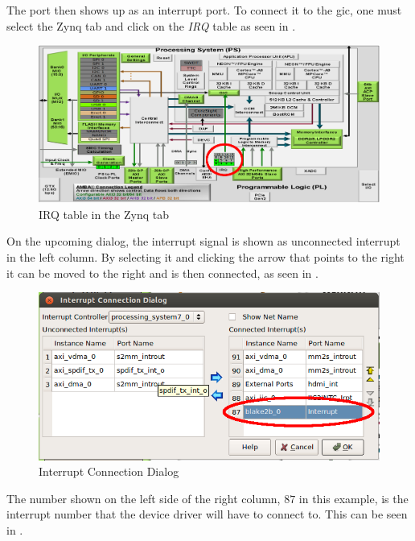 The port then shows up as an interrupt port.
To connect it to the \gls{gic}, one must select the Zynq tab and click on the
\emph{IRQ} table as seen in .

\begin{figure}[h]
\centering
\includegraphics[width=1\textwidth]{sections/methodology/gic}
\caption{\label{fig:gic} IRQ table in the Zynq tab}
\end{figure}

On the upcoming dialog, the interrupt signal is shown as unconnected interrupt
in the left column.
By selecting it and clicking the arrow that points to the right it can be moved
to the right and is then connected, as seen in .

\begin{figure}[h]
\centering
\includegraphics[width=1\textwidth]{sections/methodology/gicconnect}
\caption{\label{fig:gicconnect} Interrupt Connection Dialog}
\end{figure}

The number shown on the left side of the right column, $87$ in this example, is
the interrupt number that the device driver will have to connect to.
This can be seen in .

